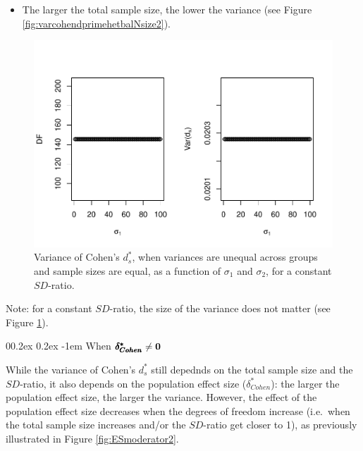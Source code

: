 \documentclass[
  english,
  man]{apa6}
\makeatletter
\providecommand{\tightlist}{%
  \setlength{\itemsep}{0pt}\setlength{\parskip}{0pt}}
\let\oldparagraph\paragraph
\renewcommand{\paragraph}[1]{\oldparagraph{#1}\mbox{}}
\renewcommand{\paragraph}{\@startsection{paragraph}{4}{\parindent}%
  {0\baselineskip \@plus 0.2ex \@minus 0.2ex}%
  {-1em}%
  {\normalfont\normalsize\bfseries\itshape\typesectitle}}
\makeatother
\begin{document}
\begin{itemize}
\tightlist
\item
  The larger the total sample size, the lower the variance (see Figure \ref{fig:varcohendprimehetbalNsize2}).
\end{itemize}

\begin{figure}
\centering
\includegraphics{Theoretical-Variance-of-all-estimators-as-a-function-of-population-parameters_files/figure-latex/varcohendprimehetbalvariance2-1.pdf}
\caption{\label{fig:varcohendprimehetbalvariance2}Variance of Cohen's \(d^*_s\), when variances are unequal across groups and sample sizes are equal, as a function of \(\sigma_1\) and \(\sigma_2\), for a constant \(SD\)-ratio.}
\end{figure}

Note: for a constant \(SD\)-ratio, the size of the variance does not matter (see Figure \ref{fig:varcohendprimehetbalvariance2}).

\hypertarget{when-bf-pmbdelta_cohen-neq-0-2}{%
\paragraph{\texorpdfstring{When \(\bf \pmb{\delta^*_{Cohen}} \neq 0\)}{When \textbackslash bf \textbackslash pmb\{\textbackslash delta\^{}*\_\{Cohen\}\} \textbackslash neq 0}}\label{when-bf-pmbdelta_cohen-neq-0-2}}

While the variance of Cohen's \(d^*_s\) still depednds on the total sample size and the \(SD\)-ratio, it also depends on the population effect size (\(\delta^*_{Cohen}\)): the larger the population effect size, the larger the variance. However, the effect of the population effect size decreases when the degrees of freedom increase (i.e.~when the total sample size increases and/or the \(SD\)-ratio get closer to 1), as previously illustrated in Figure \ref{fig:ESmoderator2}.
\end{document}
